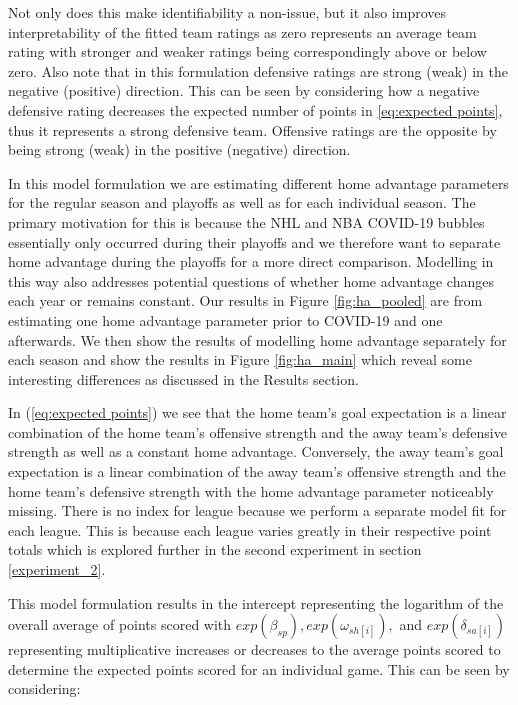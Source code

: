 Not only does this make identifiability a non-issue, but it also improves interpretability of the fitted team ratings as zero represents an average team rating with stronger and weaker ratings being correspondingly above or below zero. Also note that in this formulation defensive ratings are strong (weak) in the negative (positive) direction. This can be seen by considering how a negative defensive rating decreases the expected number of points in \ref{eq:expected points}, thus it represents a strong defensive team. Offensive ratings are the opposite by being strong (weak) in the positive (negative) direction.

In this model formulation we are estimating different home advantage parameters for the regular season and playoffs as well as for each individual season. The primary motivation for this is because the NHL and NBA COVID-19 bubbles essentially only occurred during their playoffs and we therefore want to separate home advantage during the playoffs for a more direct comparison. Modelling in this way also addresses potential questions of whether home advantage changes each year or remains constant. Our results in Figure \mbox{\ref{fig:ha_pooled}} are from estimating one home advantage parameter prior to COVID-19 and one afterwards. We then show the results of modelling home advantage separately for each season and show the results in Figure \mbox{\ref{fig:ha_main}} which reveal some interesting differences as discussed in the Results section.

In (\ref{eq:expected points}) we see that the home team's goal expectation is a linear combination of the home team's offensive strength and the away team's defensive strength as well as a constant home advantage. Conversely, the away team's goal expectation is a linear combination of the away team's offensive strength and the home team's defensive strength with the home advantage parameter noticeably missing. There is no index for league because we perform a separate model fit for each league. This is because each league varies greatly in their respective point totals which is explored further in the second experiment in section \ref{experiment_2}.

This model formulation results in the intercept representing the logarithm of the overall average of points scored with \(exp(\beta_{sp}), exp(\omega_{sh[i]}),\) and \(exp(\delta_{sa[i]})\) representing multiplicative increases or decreases to the average points scored to determine the expected points scored for an individual game. This can be seen by considering:

